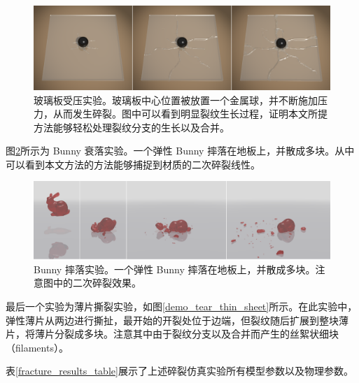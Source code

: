 \begin{figure}[!htb]
  \centering
  \captionsetup{justification=centering}
  \includegraphics[width=\linewidth]{chap/image/demo_brittle_fall}

  \caption{\label{demo_brittle_fall}
           玻璃板受压实验。玻璃板中心位置被放置一个金属球，并不断施加压力，从而发生碎裂。图中可以看到明显裂纹生长过程，证明本文所提方法能够轻松处理裂纹分支的生长以及合并。
          }
\end{figure}

图\ref{demo_fall_bunny}所示为 Bunny 衰落实验。一个弹性 Bunny 摔落在地板上，并散成多块。从中可以看到本文方法的方法能够捕捉到材质的二次碎裂线性。

\begin{figure}[!htb]
  \centering
  \captionsetup{justification=centering}
  \includegraphics[width=\linewidth]{chap/image/demo_fall_bunny}

  \caption{\label{demo_fall_bunny}
           Bunny 摔落实验。一个弹性 Bunny 摔落在地板上，并散成多块。注意图中的二次碎裂效果。
          }
\end{figure}

最后一个实验为薄片撕裂实验，如图\ref{demo_tear_thin_sheet}所示。在此实验中，弹性薄片从两边进行撕扯，最开始的开裂处位于边端，但裂纹随后扩展到整块薄片，将薄片分裂成多块。注意其中由于裂纹分支以及合并而产生的丝絮状细块（filaments）。

表\ref{fracture_results_table}展示了上述碎裂仿真实验所有模型参数以及物理参数。

